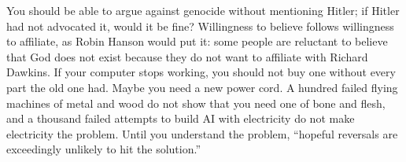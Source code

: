 You should be able to argue against genocide without mentioning Hitler; if Hitler had not advocated it, would it be fine? Willingness to believe follows willingness to affiliate, as Robin Hanson would put it: some people are reluctant to believe that God does not exist because they do not want to affiliate with Richard Dawkins. If your computer stops working, you should not buy one without every part the old one had. Maybe you need a new power cord. A hundred failed flying machines of metal and wood do not show that you need one of bone and flesh, and a thousand failed attempts to build AI with electricity do not make electricity the problem. Until you understand the problem, ``hopeful reversals are exceedingly unlikely to hit the solution.''
